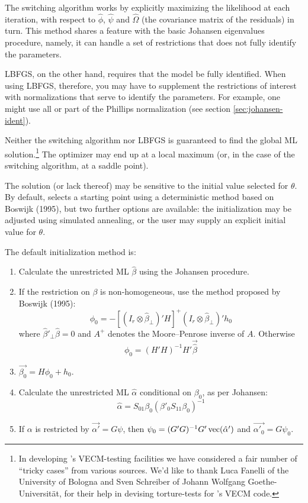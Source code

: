 The switching algorithm works by explicitly maximizing the likelihood
at each iteration, with respect to $\hat{\phi}$, $\hat{\psi}$ and
$\hat{\Omega}$ (the covariance matrix of the residuals) in turn.  This
method shares a feature with the basic Johansen eigenvalues procedure,
namely, it can handle a set of restrictions that does not fully
identify the parameters.

LBFGS, on the other hand, requires that the model be fully identified.
When using LBFGS, therefore, you may have to supplement the
restrictions of interest with normalizations that serve to identify
the parameters.  For example, one might use all or part of the
Phillips normalization (see section \ref{sec:johansen-ident}).

Neither the switching algorithm nor LBFGS is guaranteed to find the
global ML solution.\footnote{In developing 's VECM-testing
  facilities we have considered a fair number of ``tricky cases'' from
  various sources. We'd like to thank Luca Fanelli of the University
  of Bologna and Sven Schreiber of Johann Wolfgang Goethe-Universit\"at,
  for their help in devising torture-tests for 's VECM
  code.} The optimizer may end up at a local maximum (or, in the case
of the switching algorithm, at a saddle point).

The solution (or lack thereof) may be sensitive to the initial value
selected for $\theta$.  By default,  selects a starting
point using a deterministic method based on Boswijk (1995), but two
further options are available: the initialization may be adjusted
using simulated annealing, or the user may supply an explicit initial
value for $\theta$.

The default initialization method is:
%
\begin{enumerate}
\item Calculate the unrestricted ML $\hat{\beta}$ using the
  Johansen procedure.
\item If the restriction on $\beta$ is non-homogeneous, use the
  method proposed by Boswijk (1995):
\begin{equation}
\phi_0 = -[(I_r \otimes \hat{\beta}_{\perp})'H]^+ 
  (I_r \otimes \hat{\beta}_{\perp})' h_0
\end{equation}
where $\hat{\beta}'_{\perp} \hat{\beta} = 0$ and $A^+$ denotes
the Moore--Penrose inverse of $A$.  Otherwise
\begin{equation}
\phi_0 = (H'H)^{-1} H' \vec{\hat{\beta}}
\end{equation}
\item $\vec{\beta_0} = H\phi_0 + h_0$.
\item Calculate the unrestricted ML $\hat{\alpha}$ conditional on
  $\beta_0$, as per Johansen:
\begin{equation}
\label{eq:Jalpha}
\hat{\alpha} = S_{01} \beta_0 (\beta'_0S_{11}\beta_0)^{-1}
\end{equation}
\item If $\alpha$ is restricted by $\vec{\alpha'} = G\psi$, then
  $\psi_0 = (G'G)^{-1}G'\,{\rm vec}(\hat{\alpha}')$ and
  $\vec{\alpha'_0} = G\psi_0$.
\end{enumerate}

